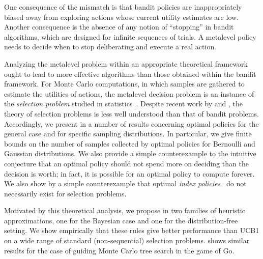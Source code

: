 One consequence of the mismatch is that bandit policies are
inappropriately biased away from exploring actions whose current
utility estimates are low.  Another consequence is the absence of any
notion of ``stopping'' in bandit algorithms, which are designed for
infinite sequences of trials.  A metalevel policy needs to decide
when to stop deliberating and execute a real action.

Analyzing the metalevel problem within an appropriate theoretical
framework ought to lead to more effective algorithms than those
obtained within the bandit framework.  For Monte Carlo computations,
in which samples are gathered to estimate the utilities of actions,
the metalevel decision problem is an instance of the {\em selection
problem} studied in statistics~\citep{Bechhofer:1954,Swisher+et+al:2003}.  Despite
recent work by \citet{Frazier+Powell:2010} and \citet{TolpinShimony:2012}, the theory of selection
problems is less well understood than that of bandit problems.
Accordingly, we present in 
a number of results concerning optimal policies for the general case
and for specific sampling distributions. In particular, we give finite
bounds on the number of samples collected by optimal policies for
Bernoulli and Gaussian distributions. We also provide a simple
counterexample to the intuitive conjecture that an optimal policy
should not spend more on deciding than the decision is worth; in fact,
it is possible for an optimal policy to compute forever. We also show
by a simple counterexample that optimal {\em index
policies}~\citep{Gittins:1989} do not necessarily exist for selection
problems.

Motivated by this theoretical analysis, we propose in 
two families of heuristic approximations, one for the
Bayesian case and one for the distribution-free setting.
We show empirically that these rules give better performance than UCB1 on 
a wide range of standard (non-sequential) selection problems.
 shows similar results for the case of guiding Monte Carlo tree search
in the game of Go.
